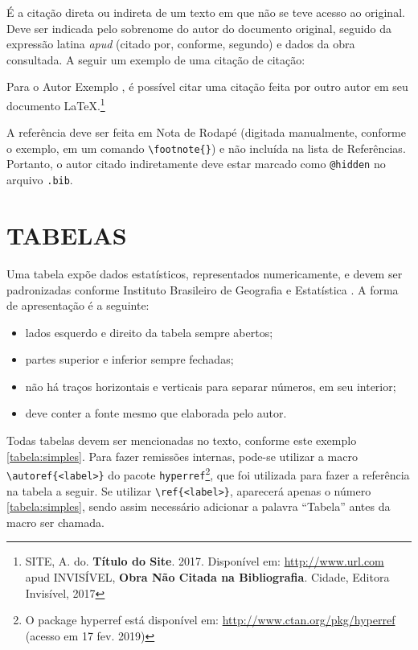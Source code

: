 \documentclass[
  12pt,		%
  a4paper,	%
  openright,%
  oneside,	%
  chapter=TITLE,		%
  section=TITLE,		%
  english,	%
  french,	%
  spanish,	%
  brazil
]{abntex2}
\begin{document}
            É a citação direta ou indireta de um texto em que não se teve acesso ao original. Deve ser indicada pelo sobrenome do autor do documento original, seguido da expressão latina \textit{apud} (citado por, conforme, segundo) e dados da obra consultada. A seguir um exemplo de uma citação de citação:
            
            Para o Autor Exemplo , é possível citar uma citação feita por outro autor em seu documento \LaTeX.\footnote{SITE, A. do. \textbf{Título do Site}. 2017. Disponível em: \url{http://www.url.com} apud INVISÍVEL, \textbf{Obra Não Citada na Bibliografia}. Cidade, Editora Invisível, 2017}
            
            A referência deve ser feita em Nota de Rodapé (digitada manualmente, conforme o exemplo, em um comando \verb|\footnote{}|) e não incluída na lista de Referências. Portanto, o autor citado indiretamente deve estar marcado como \verb|@hidden| no arquivo \verb|.bib|. 
         
         
         \section{TABELAS}
         
         Uma tabela expõe dados estatísticos, representados numericamente, e devem ser padronizadas conforme Instituto Brasileiro de Geografia e Estatística \cite{ibge1993}. A forma de apresentação é a seguinte: 
                \begin{itemize}
                    \item lados esquerdo e direito da tabela sempre abertos;
                    \item partes superior e inferior sempre fechadas;
                    \item não há traços horizontais e verticais para separar números, em seu interior;
                    \item deve conter a fonte mesmo que elaborada pelo autor.
                \end{itemize}
                
                Todas tabelas devem ser mencionadas no texto, conforme este exemplo \autoref{tabela:simples}. Para fazer remissões internas, pode-se utilizar a macro \verb|\autoref{<label>}| do pacote \verb|hyperref|\footnote{O package hyperref está disponível em: \url{http://www.ctan.org/pkg/hyperref} (acesso em 17 fev. 2019)}, que foi utilizada para fazer a referência na tabela a seguir. Se utilizar \verb|\ref{<label>}|, aparecerá apenas o número \ref{tabela:simples}, sendo assim necessário adicionar a palavra ``Tabela'' antes da macro ser chamada. 
\end{document}
